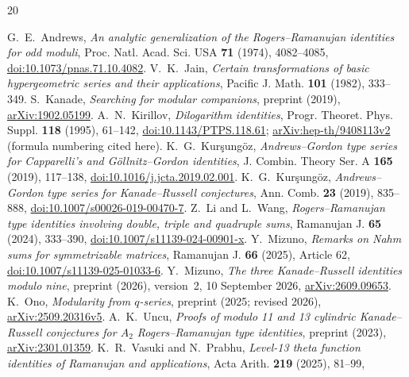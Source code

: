 \documentclass[11pt,reqno]{amsart}
\theoremstyle{remark}
\numberwithin{equation}{section}
\begin{document}
\begin{thebibliography}{20}
\raggedright
{}
G.~E.~Andrews, \emph{An analytic generalization of the Rogers--Ramanujan
identities for odd moduli}, Proc. Natl. Acad. Sci. USA \textbf{71} (1974),
4082--4085, \href{https://doi.org/10.1073/pnas.71.10.4082}{doi:10.1073/pnas.71.10.4082}.
V.~K.~Jain, \emph{Certain transformations of basic hypergeometric series
and their applications}, Pacific J. Math. \textbf{101} (1982), 333--349.
S.~Kanade, \emph{Searching for modular companions}, preprint (2019),
\href{https://arxiv.org/abs/1902.05199}{arXiv:1902.05199}.
A.~N.~Kirillov, \emph{Dilogarithm identities}, Progr. Theoret. Phys. Suppl.
\textbf{118} (1995), 61--142,
\href{https://doi.org/10.1143/PTPS.118.61}{doi:10.1143/PTPS.118.61};
\href{https://arxiv.org/abs/hep-th/9408113v2}{arXiv:hep-th/9408113v2}
(formula numbering cited here).
K.~G.~Kur\c{s}ung\"oz, \emph{Andrews--Gordon type series for Capparelli's
and G\"ollnitz--Gordon identities}, J. Combin. Theory Ser. A \textbf{165}
(2019), 117--138,
\href{https://doi.org/10.1016/j.jcta.2019.02.001}{doi:10.1016/j.jcta.2019.02.001}.
K.~G.~Kur\c{s}ung\"oz, \emph{Andrews--Gordon type series for
Kanade--Russell conjectures}, Ann. Comb. \textbf{23} (2019), 835--888,
\href{https://doi.org/10.1007/s00026-019-00470-7}{doi:10.1007/s00026-019-00470-7}.
Z.~Li and L.~Wang, \emph{Rogers--Ramanujan type identities involving
double, triple and quadruple sums}, Ramanujan J. \textbf{65} (2024),
333--390,
\href{https://doi.org/10.1007/s11139-024-00901-x}{doi:10.1007/s11139-024-00901-x}.
Y.~Mizuno, \emph{Remarks on Nahm sums for symmetrizable matrices},
Ramanujan J. \textbf{66} (2025), Article 62,
\href{https://doi.org/10.1007/s11139-025-01033-6}{doi:10.1007/s11139-025-01033-6}.
Y.~Mizuno, \emph{The three Kanade--Russell identities modulo nine},
preprint (2026), version~2, 10 September 2026,
\href{https://arxiv.org/abs/2609.09653}{arXiv:2609.09653}.
K.~Ono, \emph{Modularity from $q$-series}, preprint (2025; revised 2026),
\href{https://arxiv.org/abs/2509.20316v5}{arXiv:2509.20316v5}.
A.~K.~Uncu, \emph{Proofs of modulo 11 and 13 cylindric Kanade--Russell
conjectures for $A_2$ Rogers--Ramanujan type identities}, preprint (2023),
\href{https://arxiv.org/abs/2301.01359}{arXiv:2301.01359}.
K.~R.~Vasuki and N.~Prabhu, \emph{Level-13 theta function identities of
Ramanujan and applications}, Acta Arith. \textbf{219} (2025), 81--99,

\end{thebibliography}
\end{document}

